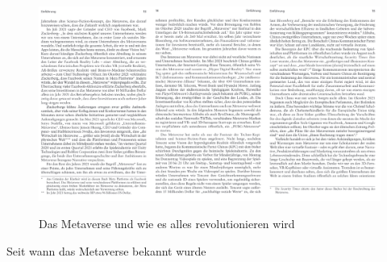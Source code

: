 \begin{figure}[h]
\centering
\includegraphics*{figures/Das_Metaverse_uwearw13-15.png}
\caption{Das Metaverse und wie es alles revolutionieren wird}
\label{fig:meine-grafik}
\cite{Ball22}
\end{figure}


Seit wann das Metaverse bekannt wurde \cite{Ball22a}